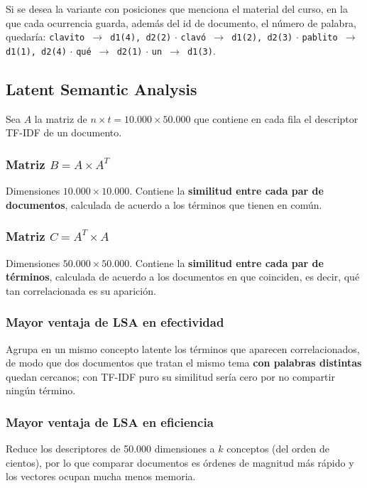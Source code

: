 \documentclass[11pt, a4paper]{article}
\newcommand{\code}[1]{\texttt{#1}}
\begin{document}
Si se desea la variante con posiciones que menciona el material del curso, en la que cada
ocurrencia guarda, además del id de documento, el número de palabra, quedaría:
\code{clavito $\rightarrow$ d1(4), d2(2)} $\cdot$ \code{clavó $\rightarrow$ d1(2), d2(3)} $\cdot$
\code{pablito $\rightarrow$ d1(1), d2(4)} $\cdot$ \code{qué $\rightarrow$ d2(1)} $\cdot$
\code{un $\rightarrow$ d1(3)}.

\subsection{Latent Semantic Analysis}

Sea $A$ la matriz de $n \times t = 10.000 \times 50.000$ que contiene en cada fila el descriptor
TF-IDF de un documento.

\subsubsection{Matriz $B = A \times A^T$}
Dimensiones $\mathbf{10.000 \times 10.000}$. Contiene la \textbf{similitud entre cada par de
documentos}, calculada de acuerdo a los términos que tienen en común.

\subsubsection{Matriz $C = A^T \times A$}
Dimensiones $\mathbf{50.000 \times 50.000}$. Contiene la \textbf{similitud entre cada par de
términos}, calculada de acuerdo a los documentos en que coinciden, es decir, qué tan correlacionada
es su aparición.

\subsubsection{Mayor ventaja de LSA en efectividad}
Agrupa en un mismo concepto latente los términos que aparecen correlacionados, de modo que dos
documentos que tratan el mismo tema \textbf{con palabras distintas} quedan cercanos; con TF-IDF puro
su similitud sería cero por no compartir ningún término.

\subsubsection{Mayor ventaja de LSA en eficiencia}
Reduce los descriptores de 50.000 dimensiones a $k$ conceptos (del orden de cientos), por lo que
comparar documentos es órdenes de magnitud más rápido y los vectores ocupan mucha menos memoria.
\end{document}
